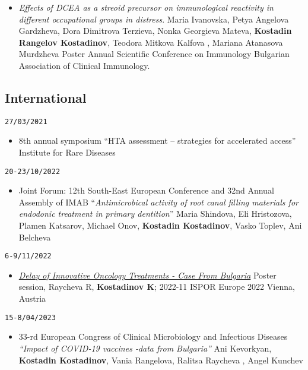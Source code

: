 \documentclass[
  12pt,
  letterpaper,
  DIV=11,
  numbers=noendperiod]{scrartcl}
\providecommand{\tightlist}{%
  \setlength{\itemsep}{0pt}\setlength{\parskip}{0pt}}\usepackage{longtable,booktabs,array}
\begin{document}
\begin{itemize}
\tightlist
\item
  \emph{Effects of DCEA as a streoid precursor on immunological
  reactivity in different occupational groups in distress}. \textbar{}
  Maria Ivanovska, Petya Angelova Gardzheva, Dora Dimitrova Terzieva,
  Nonka Georgieva Mateva, \textbf{Kostadin Rangelov Kostadinov}, Teodora
  Mitkova Kalfova , Mariana Atanasova Murdzheva \textbar{} Poster
  \textbar{} Annual Scientific Conference on Immunology \textbar{}
  Bulgarian Association of Clinical Immunology.
\end{itemize}

\subsection{International}\label{international-1}

\texttt{27/03/2021}

\begin{itemize}
\tightlist
\item
  8th annual symposium ``HTA assessment -- strategies for accelerated
  access'' \textbar{} Institute for Rare Diseases
\end{itemize}

\texttt{20-23/10/2022}

\begin{itemize}
\tightlist
\item
  Joint Forum: 12th South-East European Conference and 32nd Annual
  Assembly of IMAB \textbar{} ``\emph{Antimicrobical activity of root
  canal filling materials for endodonic treatment in primary
  dentition}'' \textbar{} Maria Shindova, Eli Hristozova, Plamen
  Katsarov, Michael Onov, \textbf{Kostadin Kostadinov}, Vasko Toplev,
  Ani Belcheva
\end{itemize}

\texttt{6-9/11/2022}

\begin{itemize}
\tightlist
\item
  \emph{\href{https://www.ispor.org/heor-resources/presentations-database/presentation/euro2022-3565/120960}{Delay
  of Innovative Oncology Treatments - Case From Bulgaria}} \textbar{}
  Poster session, Raycheva R, \textbf{Kostadinov K}; \textbar{} 2022-11
  \textbar{} ISPOR Europe 2022 \textbar{} Vienna, Austria
\end{itemize}

\texttt{15-8/04/2023}

\begin{itemize}
\tightlist
\item
  33-rd European Congress of Clinical Microbiology and Infectious
  Diseases \textbar{} \emph{``Impact of COVID-19 vaccines -data from
  Bulgaria''} \textbar{} Ani Kevorkyan, \textbf{Kostadin Kostadinov},
  Vania Rangelova, Ralitsa Raycheva , Angel Kunchev
\end{itemize}
\end{document}
